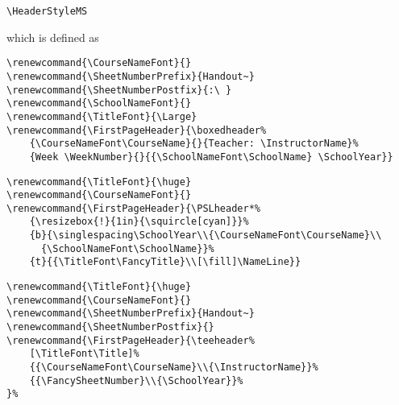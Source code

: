 \documentclass[12pt,twoside,parskip,notitle]{handout}
\begin{document}
\newpage

\begingroup
\HeaderStyleMS
\maketitle
\verb|\HeaderStyleMS|

which is defined as

\singlespacing
\begin{verbatim}
\renewcommand{\CourseNameFont}{}
\renewcommand{\SheetNumberPrefix}{Handout~}
\renewcommand{\SheetNumberPostfix}{:\ }
\renewcommand{\SchoolNameFont}{}
\renewcommand{\TitleFont}{\Large}
\renewcommand{\FirstPageHeader}{\boxedheader%
    {\CourseNameFont\CourseName}{}{Teacher: \InstructorName}%
    {Week \WeekNumber}{}{{\SchoolNameFont\SchoolName} \SchoolYear}}
\end{verbatim}
\endgroup

\newpage

\begingroup
\renewcommand{\Title}{A very very very long title indeed!}
\renewcommand{\TitleFont}{\huge}
\renewcommand{\CourseNameFont}{}
\renewcommand{\FirstPageHeader}{\PSLheader*%
	{\resizebox{!}{1in}{\squircle[cyan]}}%
	{b}{\singlespacing\SchoolYear\\{\CourseNameFont\CourseName}\\{\SchoolNameFont\SchoolName}}%
	{t}{{\TitleFont\FancyTitle}\\[\fill]\NameLine}}
\maketitle
\singlespacing
\begin{verbatim}
\renewcommand{\TitleFont}{\huge}
\renewcommand{\CourseNameFont}{}
\renewcommand{\FirstPageHeader}{\PSLheader*%
    {\resizebox{!}{1in}{\squircle[cyan]}}%
    {b}{\singlespacing\SchoolYear\\{\CourseNameFont\CourseName}\\
      {\SchoolNameFont\SchoolName}}%
    {t}{{\TitleFont\FancyTitle}\\[\fill]\NameLine}}
\end{verbatim}
\endgroup

\newpage

\begingroup
\renewcommand{\TitleFont}{\huge}
\renewcommand{\CourseNameFont}{}
\renewcommand{\SheetNumberPrefix}{Handout~}
\renewcommand{\SheetNumberPostfix}{}
\renewcommand{\FirstPageHeader}{\teeheader%
	[\TitleFont\Title]%
	{{\CourseNameFont\CourseName}\\{\InstructorName}}%
	{{\FancySheetNumber}\\{\SchoolYear}}%
}%
\maketitle
\singlespacing
\begin{verbatim}
\renewcommand{\TitleFont}{\huge}
\renewcommand{\CourseNameFont}{}
\renewcommand{\SheetNumberPrefix}{Handout~}
\renewcommand{\SheetNumberPostfix}{}
\renewcommand{\FirstPageHeader}{\teeheader%
    [\TitleFont\Title]%
    {{\CourseNameFont\CourseName}\\{\InstructorName}}%
    {{\FancySheetNumber}\\{\SchoolYear}}%
}%
\end{verbatim}
\endgroup
\end{document}
